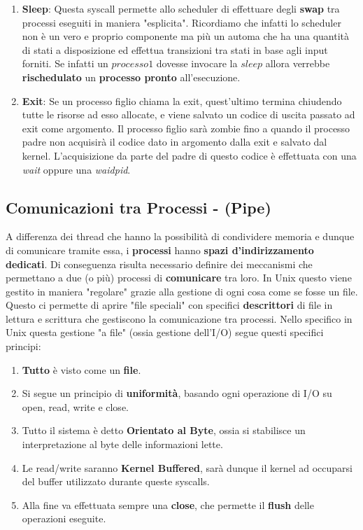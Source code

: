 \documentclass{article}
\begin{document}
\begin{enumerate}
\item \textbf{Sleep}: Questa syscall permette allo scheduler di effettuare degli \textbf{swap} tra processi eseguiti in maniera "esplicita". Ricordiamo che infatti
lo scheduler non è un vero e proprio componente ma più un automa che ha una quantità di stati a disposizione ed effettua transizioni tra stati
in base agli input forniti. Se infatti un $processo1$ dovesse invocare la $sleep$ allora verrebbe \textbf{rischedulato} un \textbf{processo pronto} all'esecuzione.
    
\item \textbf{Exit}: Se un processo figlio chiama la exit, quest'ultimo termina chiudendo tutte le risorse ad esso allocate, e viene salvato un codice di uscita
passato ad exit come argomento. Il processo figlio sarà zombie fino a quando il processo padre non acquisirà il codice dato in argomento dalla exit
e salvato dal kernel. L'acquisizione da parte del padre di questo codice è effettuata con una \textit{wait} oppure una \textit{waidpid}.

\end{enumerate}

\subsection{Comunicazioni tra Processi - (Pipe)}

A differenza dei thread che hanno la possibilità di condividere memoria e dunque di comunicare tramite essa, i \textbf{processi} hanno \textbf{spazi d'indirizzamento dedicati}. Di conseguenza risulta necessario definire dei meccanismi che permettano a due (o più) processi di \textbf{comunicare} tra loro. In Unix questo viene
gestito in maniera "regolare" grazie alla gestione di ogni cosa come se fosse un file. Questo ci permette di aprire "file speciali" con specifici \textbf{descrittori}
di file in lettura e scrittura che gestiscono la comunicazione tra processi. Nello specifico in Unix questa gestione "a file" (ossia gestione dell'I/O) segue questi specifici principi:

\begin{enumerate}
    \item \textbf{Tutto} è visto come un \textbf{file}.
    \item Si segue un principio di \textbf{uniformità}, basando ogni operazione di I/O su open, read, write e close.
    \item Tutto il sistema è detto \textbf{Orientato al Byte}, ossia si stabilisce un interpretazione al byte delle informazioni lette.
    \item Le read/write saranno \textbf{Kernel Buffered}, sarà dunque il kernel ad occuparsi del buffer utilizzato durante queste syscalls.
    \item Alla fine va effettuata sempre una \textbf{close}, che permette il \textbf{flush} delle operazioni eseguite.
\end{enumerate}
\end{document}
